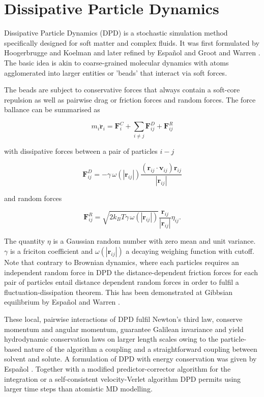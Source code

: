 \documentclass[8.5pt,twoside,twocolumn]{article}
\newcommand{\beq}{\begin{equation}}
\newcommand{\eeq}{\end{equation}}
\begin{document}
\section{Dissipative Particle Dynamics}

Dissipative Particle Dynamics (DPD) is a stochastic simulation method specifically designed for soft matter
and complex fluids. It was first formulated by Hoogerbrugge and Koelman 
\cite{Hoogerbrugge:1992, Koelman:1993} and later refined by Espa\~nol \cite{Espanol:1995b} and 
Groot and Warren \cite{Groot:1997}.
The basic idea is akin to coarse-grained molecular dynamics with atoms agglomerated into larger
entities or 'beads' that interact via soft forces. 

The beads are subject to conservative forces that always contain a soft-core repulsion as well as pairwise drag
or friction forces and random forces. The force ballance can be summarised as

\beq
m_i \ddot{{\mathbf{r}}}_i=\mathbf{F}_i^C+\sum_{i\neq j}\mathbf{F}_{ij}^D + \mathbf{F}_{ij}^R
\eeq

with dissipative forces between a pair of particles $i-j$ 

\beq
\mathbf{F}_{ij}^D=-\gamma\,\omega(|\mathbf{r}_{ij}|)\frac{(\mathbf{r}_{ij}\cdot\mathbf{v}_{ij})\mathbf{r}_{ij}}{|\mathbf{r}_{ij}|}
\eeq

and random forces 

\beq
\mathbf{F}_{ij}^R=\sqrt{2 k_B T \gamma\, \omega(|\mathbf{r}_{ij}|)} \frac{\mathbf{r}_{ij}}{|\mathbf{r}_{ij}|}\eta_{ij}.
\eeq

The quantity $\eta$ is a Gaussian random number with zero mean and unit variance. $\gamma$ is a friciton coefficient and
$\omega(|\mathbf{r}_{ij}|)$ a decaying weighing function with cutoff. 
Note that contrary to Brownian dynamics, where each particles requires an independent random force in DPD the 
distance-dependent friction forces for each pair of particles entail distance dependent random forces 
in order to fulfil a fluctuation-dissipation theorem.
This has been demonstrated at Gibbsian equilibrium by Espa\~nol and Warren \cite{Espanol:1995a}.

These local, pairwise interactions of DPD fulfil Newton's third law, conserve momentum and angular momentum, 
guarantee Galilean invariance and yield hydrodynamic conservation laws on larger length scales owing to the 
particle-based nature of the algorithm a coupling and a straightforward coupling between solvent and solute.
A formulation of DPD with energy conservation was given by Espa\~nol \cite{Espanol:1997}.
Together with a modified predictor-corrector algorithm for the integration \cite{Groot:1997} or a self-consistent 
 velocity-Verlet algorithm \cite{Pagonabarraga:2001} DPD permits using larger time steps than atomistic MD 
modelling.
\end{document}
